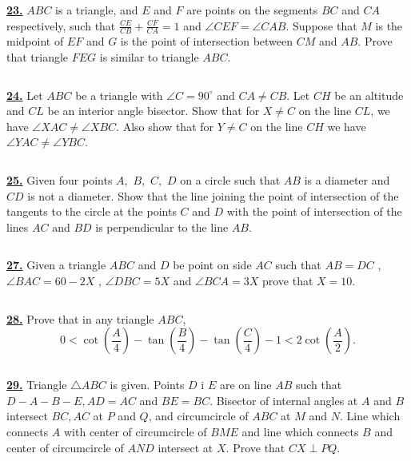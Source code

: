 \documentclass{article}
\begin{document}
$$ $$

\href{http://www.artofproblemsolving.com/Forum/viewtopic.php?p=2114602#p2114602}{\bf 23.} $ABC$ is a triangle, and $E$ and $F$ are points on the segments $BC$ and $CA$ respectively, such that $\frac{CE}{CB}+\frac{CF}{CA}=1$ and $\angle CEF=\angle CAB$. Suppose that $M$ is the midpoint of $EF$ and $G$ is the point of intersection between $CM$ and $AB$. Prove that triangle $FEG$ is similar to triangle $ABC$.

$$ $$

\href{http://www.artofproblemsolving.com/Forum/viewtopic.php?p=358032#p358032}{\bf 24.} Let $ABC$ be a triangle with $\angle C = 90^\circ$ and $CA \neq CB$. Let $CH$ be an altitude and $CL$ be an interior angle bisector. Show that for $X \neq C$ on the line $CL$, we have $\angle XAC \neq \angle XBC$. Also show that for $Y \neq C$ on the line $CH$ we have $\angle YAC \neq \angle YBC$.

$$ $$

\href{http://www.artofproblemsolving.com/Forum/viewtopic.php?p=113332#p113332}{\bf 25.} Given four points $A,$ $B,$ $C,$ $D$ on a circle such that $AB$ is a diameter and $CD$ is not a diameter. Show that the line joining the point of intersection of the tangents to the circle at the points $C$ and $D$ with the point of intersection of the lines $AC$ and $BD$ is perpendicular to the line $AB.$

$$ $$

\href{http://www.artofproblemsolving.com/Forum/viewtopic.php?p=1992097#p1992097
 }{\bf 27.} Given a triangle $ABC$ and $D$ be point on side $AC$ such that $AB=DC$ , $\angle BAC=60-2X$ , $\angle DBC=5X$ and $\angle BCA=3X$
prove that $X=10.$


$$ $$

\href{http://www.artofproblemsolving.com/Forum/viewtopic.php?p=333377#p333377
 }{\bf 28.} Prove that in any triangle $ABC$,
$$0 < \cot { \left( \frac{A}{4} \right)} - \tan{ \left( \frac{B}{4} \right) } - \tan{ \left( \frac{C}{4} \right) } - 1 < 2 \cot { \left( \frac{A}{2} \right) }.  $$


$$ $$


\href{http://www.artofproblemsolving.com/Forum/viewtopic.php?p=1099544#p1099544
 }{\bf 29.} Triangle $ \triangle ABC$ is given. Points $ D$ i $ E$ are on line  $ AB$ such that  $ D - A - B - E, AD = AC$ and $ BE = BC$. Bisector of internal angles at $ A$ and $ B$ intersect $ BC,AC$ at $ P$ and $ Q$, and circumcircle of  $ ABC$ at  $ M$ and  $ N$. Line which connects  $ A$ with center of circumcircle of $ BME$ and line which connects $ B$ and center of circumcircle of $ AND$ intersect at $ X$. Prove that $ CX \perp PQ$.
\end{document}
